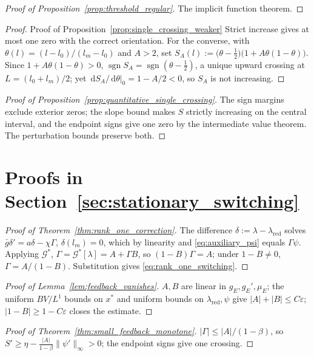 \documentclass[pdflatex,sn-mathphys-num]{sn-jnl}
\newcommand{\dd}{\,\mathrm{d}}
\theoremstyle{plain}
\theoremstyle{definition}
\theoremstyle{remark}
\begin{document}
\begin{proof}[Proof of Proposition~\ref{prop:threshold_regular}]
The implicit function theorem.
\end{proof}

\begin{proof}{Proof of Proposition~\ref{prop:single_crossing_weaker}}
Strict increase gives at most one zero with the correct orientation. For the
converse, with $\theta(l)=(l-l_0)/(l_m-l_0)$ and $A>2$, set
$\displaystyle S_A(l):=\big(\theta-\tfrac12\big)\big(1+A\theta(1-\theta)\big)$.
Since $1+A\theta(1-\theta)>0$, $\operatorname{sgn}S_A=\operatorname{sgn}(\theta-\tfrac12)$, a unique
upward crossing at $L=(l_0+l_m)/2$; yet $\dd S_A/\dd\theta|_0=1-A/2<0$, so $S_A$ is
not increasing.
\end{proof}

\begin{proof}[Proof of Proposition~\ref{prop:quantitative_single_crossing}]
The sign margins exclude exterior zeros; the slope bound makes $S$ strictly
increasing on the central interval, and the endpoint signs give one zero by the
intermediate value theorem. The perturbation bounds preserve both.
\end{proof}

\section{Proofs in Section~\ref{sec:stationary_switching}}

\begin{proof}[Proof of Theorem~\ref{thm:rank_one_correction}]
The difference $\delta:=\lambda-\lambda_{\mathrm{red}}$ solves
$\bar g\delta'=a\delta-\chi\Gamma$, $\delta(l_m)=0$, which by linearity and
\eqref{eq:auxiliary_psi} equals $\Gamma\psi$. Applying $\mathcal G^*$,
$\Gamma=\mathcal G^*[\lambda]=A+\Gamma B$, so $(1-B)\Gamma=A$; under $1-B\neq0$,
$\Gamma=A/(1-B)$. Substitution gives \eqref{eq:rank_one_switching}.
\end{proof}

\begin{proof}[Proof of Lemma~\ref{lem:feedback_vanishes}]
$A,B$ are linear in $g_E,g_E',\mu_E$; the uniform $BV/L^1$ bounds on $x^*$ and
uniform bounds on $\lambda_{\mathrm{red}},\psi$ give $|A|+|B|\le C\varepsilon$;
$|1-B|\ge1-C\varepsilon$ closes the estimate.
\end{proof}

\begin{proof}[Proof of Theorem~\ref{thm:small_feedback_monotone}]
$|\Gamma|\le|A|/(1-\beta)$, so
$S'\ge\eta-\frac{|A|}{1-\beta}\|\psi'\|_\infty>0$; the endpoint signs give one
crossing.
\end{proof}
\end{document}
